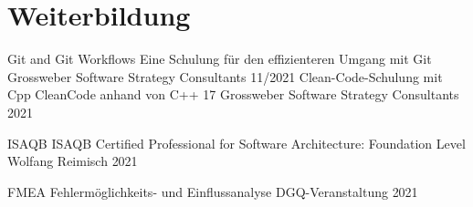 
\section{Weiterbildung}
\begin{cvhonors}

\cvhonor
{Git and Git Workflows} %
{Eine Schulung für den effizienteren Umgang mit Git} %
{Grossweber Software Strategy Consultants} %
{11/2021} %
\cvhonor
{Clean-Code-Schulung mit Cpp} %
{CleanCode anhand von C++ 17} %
{Grossweber Software Strategy Consultants} %
{2021} %

\cvhonor
{ISAQB} %
{ISAQB Certified Professional for
Software Architecture: Foundation Level} %
{Wolfang Reimisch} %
{2021} %

\cvhonor
{FMEA} %
{Fehlermöglichkeits- und Einflussanalyse} %
{DGQ-Veranstaltung} %
{2021} %

\end{cvhonors}